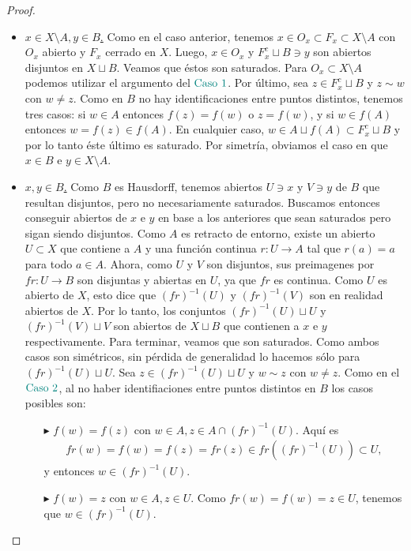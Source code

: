 \documentclass[11pt]{article}
\newcommand{\paint}[2]{\color{#1}{#2}}
\begin{document}
\begin{proof}
\begin{itemize}
\item \underline{\textbf{\paint{grey-light-blue}{\text{Caso $2$:}}} $x \in X \setminus A, y \in B$.} Como en el caso anterior, tenemos $x \in O_x \subset F_x \subset X \setminus A$ con $O_x$ abierto y $F_x$ cerrado en $X$. Luego, $x \in O_x$ y $F_x^c \sqcup B \ni y$ son abiertos disjuntos en $X \sqcup B$. Veamos que \'estos son saturados. Para $O_x \subset X \setminus A$ podemos utilizar el argumento del $\paint{grey-light-blue}{\text{Caso } 1}$. Por \'ultimo, sea $z \in F_x^c \sqcup B$ y $z \sim w$ con $w \neq z$. Como en $B$ no hay identificaciones entre puntos distintos, tenemos tres casos: si $w \in A$ entonces $f(z) = f(w)$ o $z = f(w)$, y si $w \in f(A)$ entonces $w = f(z) \in f(A)$. En cualquier caso, $w \in A \sqcup f(A) \subset F_x^c \sqcup B$ y por lo tanto \'este \'ultimo es saturado. Por simetr\'ia, obviamos el caso en que $x \in B$ e $y \in X \setminus A$.
\item \underline{\textbf{\paint{grey-light-blue}{\text{Caso $3$:}}} $x,y \in B$.} Como $B$ es Hausdorff, tenemos abiertos $U \ni x$ y $V \ni y$ de $B$ que resultan disjuntos, pero no necesariamente saturados. Buscamos entonces conseguir abiertos de $x$ e $y$ en base a los anteriores que sean saturados pero sigan siendo disjuntos. Como $A$ es retracto de entorno, existe un abierto $U \subset X$ que contiene a $A$ y una funci\'on continua $r : U \to A$ tal que $r(a) = a$ para todo $a \in A$. Ahora, como $U$ y $V$ son disjuntos, sus preimagenes por $fr : U \to B$ son disjuntas y abiertas en $U$, ya que $fr$ es continua. Como $U$ es abierto de $X$, esto dice que $(fr)^{-1}(U)$ y $(fr)^{-1}(V)$ son en realidad abiertos de $X$. Por lo tanto, los conjuntos $(fr)^{-1}(U) \sqcup U$ y $(fr)^{-1}(V) \sqcup V$ son abiertos de $X \sqcup B$ que contienen a $x$ e $y$ respectivamente. Para terminar, veamos que son saturados. Como ambos casos son sim\'etricos, sin p\'erdida de generalidad lo hacemos s\'olo para $(fr)^{-1}(U) \sqcup U$. Sea $z \in (fr)^{-1}(U) \sqcup U$ y $w \sim z$ con $w \neq z$. Como en el $\paint{grey-light-blue}{\text{Caso } 2}$, al no haber identifiaciones entre puntos distintos en $B$ los casos posibles son:
\begin{itemize}
\item[$\blacktriangleright$] $f(w) =f(z)$ con $w \in A, z \in A \cap (fr)^{-1}(U)$. Aqu\'i es
\begin{align*}
fr(w) = f(w) = f(z) = fr(z) \in fr((fr)^{-1}(U)) \subset U,
\end{align*}
y entonces $w \in (fr)^{-1}(U)$.
\item[$\blacktriangleright$] $f(w) = z$ con $w \in A, z \in U$. Como $fr(w) = f(w) = z \in U$, tenemos que $w \in (fr)^{-1}(U)$. 

\end{itemize}
\end{itemize}
\end{proof}
\end{document}

